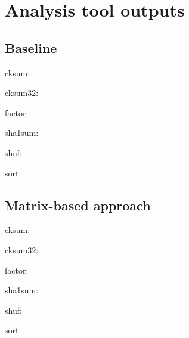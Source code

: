 \chapter{Analysis tool outputs} \label{apdx:outputs}

\section{Baseline}

cksum:

cksum32:

factor:

sha1sum:

shuf:

sort:


\section{Matrix-based approach}

cksum:

cksum32:

factor:

sha1sum:

shuf:

sort:

